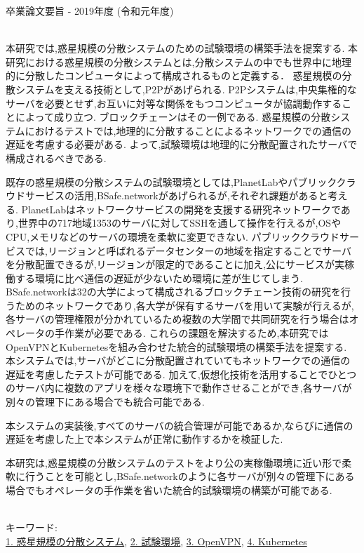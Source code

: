 卒業論文要旨 - 2019年度 (令和元年度)
\begin{center}
\begin{large}
\end{large}
\end{center}

~ \\
本研究では,惑星規模の分散システムのための試験環境の構築手法を提案する.
本研究における惑星規模の分散システムとは,分散システムの中でも世界中に地理的に分散したコンピュータによって構成されるものと定義する．
惑星規模の分散システムを支える技術として,P2Pがあげられる.
P2Pシステムは,中央集権的なサーバを必要とせず,お互いに対等な関係をもつコンピュータが協調動作することによって成り立つ.
ブロックチェーンはその一例である.
惑星規模の分散システムにおけるテストでは,地理的に分散することによるネットワークでの通信の遅延を考慮する必要がある.
よって,試験環境は地理的に分散配置されたサーバで構成されるべきである.

既存の惑星規模の分散システムの試験環境としては,PlanetLabやパブリッククラウドサービスの活用,BSafe.networkがあげられるが,それぞれ課題があると考える.
PlanetLabはネットワークサービスの開発を支援する研究ネットワークであり,世界中の717地域1353のサーバに対してSSHを通して操作を行えるが,OSやCPU,メモリなどのサーバの環境を柔軟に変更できない.
パブリッククラウドサービスでは,リージョンと呼ばれるデータセンターの地域を指定することでサーバを分散配置できるが,リージョンが限定的であることに加え,公にサービスが実稼働する環境に比べ通信の遅延が少ないため環境に差が生じてしまう.
BSafe.networkは32の大学によって構成されるブロックチェーン技術の研究を行うためのネットワークであり,各大学が保有するサーバを用いて実験が行えるが,各サーバの管理権限が分かれているため複数の大学間で共同研究を行う場合はオペレータの手作業が必要である.
これらの課題を解決するため,本研究ではOpenVPNとKubernetesを組み合わせた統合的試験環境の構築手法を提案する.
本システムでは,サーバがどこに分散配置されていてもネットワークでの通信の遅延を考慮したテストが可能である.
加えて,仮想化技術を活用することでひとつのサーバ内に複数のアプリを様々な環境下で動作させることができ,各サーバが別々の管理下にある場合でも統合可能である.

本システムの実装後,すべてのサーバの統合管理が可能であるか,ならびに通信の遅延を考慮した上で本システムが正常に動作するかを検証した.

本研究は,惑星規模の分散システムのテストをより公の実稼働環境に近い形で柔軟に行うことを可能とし,BSafe.networkのように各サーバが別々の管理下にある場合でもオペレータの手作業を省いた統合的試験環境の構築が可能である.

~ \\
キーワード:\\
\underline{1. 惑星規模の分散システム},
\underline{2. 試験環境},
\underline{3. OpenVPN},
\underline{4. Kubernetes}

\begin{flushright}
\dept \\
\author
\end{flushright}

